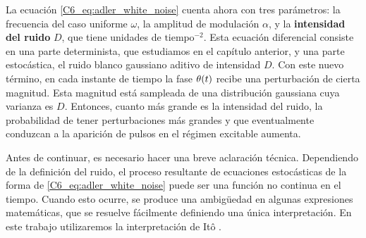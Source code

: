 \documentclass[./main.tex]{subfiles}
\begin{document}
La ecuación \ref{C6_eq:adler_white_noise} cuenta ahora con tres parámetros: la frecuencia del caso uniforme $\omega$, la amplitud de modulación $\alpha$, y la \textbf{intensidad del ruido} $D$, que tiene unidades de $\text{tiempo}^{-2}$. Esta ecuación diferencial consiste en una parte determinista, que estudiamos en el capítulo anterior, y una parte estocástica, el ruido blanco gaussiano aditivo de intensidad $D$. Con este nuevo término, en cada instante de tiempo la fase $\theta(t)$ recibe una perturbación de cierta magnitud. Esta magnitud está sampleada de una distribución gaussiana cuya varianza es $D$. Entonces, cuanto más grande es la intensidad del ruido, la probabilidad de tener perturbaciones más grandes y que eventualmente conduzcan a la aparición de pulsos en el régimen excitable aumenta.  


Antes de continuar, es necesario hacer una breve aclaración técnica. Dependiendo de la definición del ruido, el proceso resultante de ecuaciones estocásticas de la forma de \ref{C6_eq:adler_white_noise} puede ser una función no continua en el tiempo. Cuando esto ocurre, se produce una ambigüedad en algunas expresiones matemáticas, que se resuelve fácilmente definiendo una única interpretación. En este trabajo utilizaremos la interpretación de Itô \cite{SanMiguel2000}. 
\end{document}
